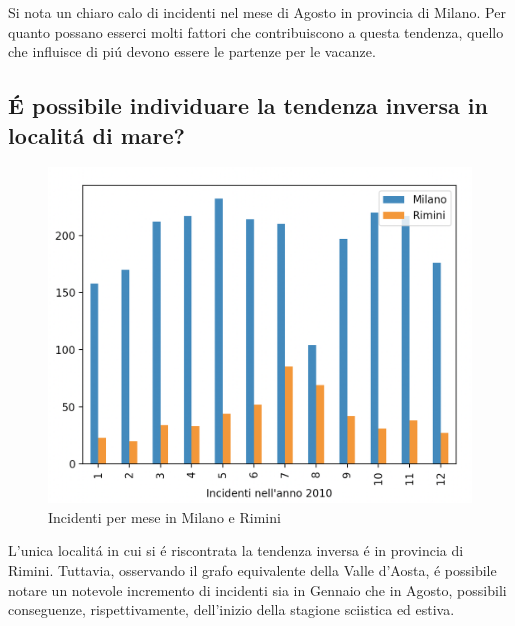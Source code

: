 \documentclass[a4paper]{report}
\begin{document}
Si nota un chiaro calo di incidenti nel mese di Agosto in provincia di Milano.
Per quanto possano esserci molti fattori che contribuiscono a questa tendenza, 
quello che influisce di pi\'u devono essere le partenze per le vacanze.

\clearpage
\subsection{\'E possibile individuare la tendenza inversa in localit\'a  di mare?}

\begin{figure}[!ht]
    \includegraphics[width=\linewidth]{../src/incidenti/incidenti_senza_coords/mese_incidenti/milano_rimini.png}
    \caption{Incidenti per mese in Milano e Rimini}
    \label{fig:milano_rimini}
\end{figure}

L'unica localit\'a in cui si \'e riscontrata la tendenza inversa \'e in provincia 
di Rimini.
Tuttavia, osservando il grafo equivalente della Valle d'Aosta, \'e possibile notare 
un notevole incremento di incidenti sia in Gennaio che in Agosto, possibili 
conseguenze, rispettivamente, dell'inizio della stagione sciistica ed estiva.
\end{document}
